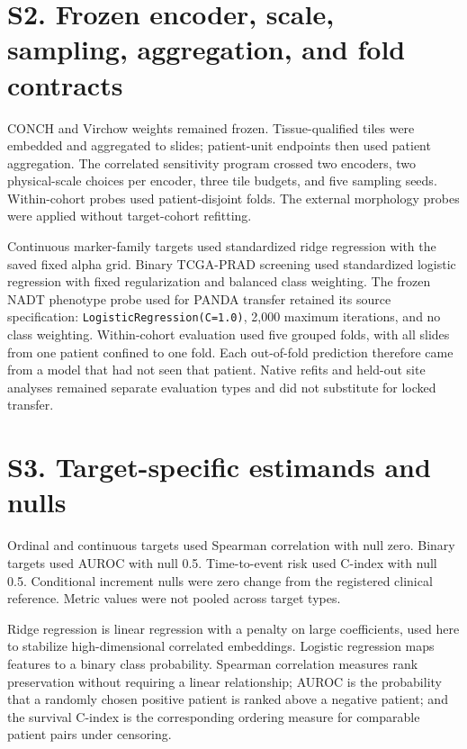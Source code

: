\section*{S2. Frozen encoder, scale, sampling, aggregation, and fold contracts}

CONCH and Virchow weights remained frozen. Tissue-qualified tiles were embedded and
aggregated to slides; patient-unit endpoints then used patient aggregation. The correlated
sensitivity program crossed two encoders, two physical-scale choices per encoder, three
tile budgets, and five sampling seeds. Within-cohort probes used patient-disjoint folds.
The external morphology probes were applied without target-cohort refitting.

Continuous marker-family targets used standardized ridge regression with the saved fixed
alpha grid. Binary TCGA-PRAD screening used standardized logistic regression with fixed
regularization and balanced class weighting. The frozen NADT phenotype probe used for PANDA
transfer retained its source specification: \texttt{LogisticRegression(C=1.0)}, 2,000
maximum iterations, and no class weighting. Within-cohort evaluation used five grouped
folds, with all slides from one patient confined to one fold. Each out-of-fold prediction
therefore came from a model that had not seen that patient. Native refits and held-out site
analyses remained separate evaluation types and did not substitute for locked transfer.

\section*{S3. Target-specific estimands and nulls}

Ordinal and continuous targets used Spearman correlation with null zero. Binary targets
used AUROC with null 0.5. Time-to-event risk used C-index with null 0.5. Conditional
increment nulls were zero change from the registered clinical reference. Metric values
were not pooled across target types.

Ridge regression is linear regression with a penalty on large coefficients, used here to
stabilize high-dimensional correlated embeddings. Logistic regression maps features to a
binary class probability. Spearman correlation measures rank preservation without requiring
a linear relationship; AUROC is the probability that a randomly chosen positive patient is
ranked above a negative patient; and the survival C-index is the corresponding ordering
measure for comparable patient pairs under censoring.

